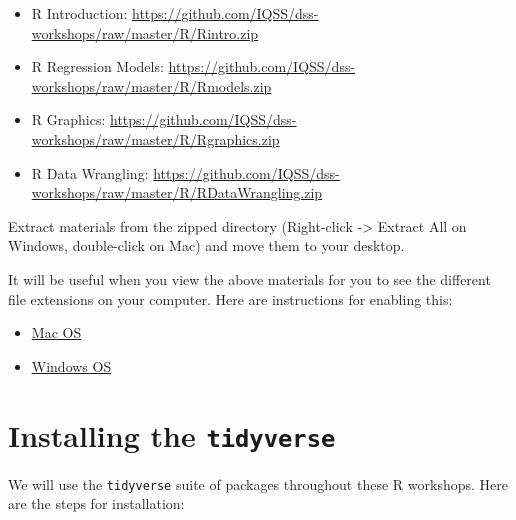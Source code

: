 \documentclass[]{book}
\providecommand{\tightlist}{%
  \setlength{\itemsep}{0pt}\setlength{\parskip}{0pt}}
\begin{document}
\begin{itemize}
\tightlist
\item
  R Introduction:
  \url{https://github.com/IQSS/dss-workshops/raw/master/R/Rintro.zip}
\item
  R Regression Models:
  \url{https://github.com/IQSS/dss-workshops/raw/master/R/Rmodels.zip}
\item
  R Graphics:
  \url{https://github.com/IQSS/dss-workshops/raw/master/R/Rgraphics.zip}
\item
  R Data Wrangling:
  \url{https://github.com/IQSS/dss-workshops/raw/master/R/RDataWrangling.zip}
\end{itemize}

Extract materials from the zipped directory (Right-click -\textgreater{}
Extract All on Windows, double-click on Mac) and move them to your
desktop.

It will be useful when you view the above materials for you to see the
different file extensions on your computer. Here are instructions for
enabling this:

\begin{itemize}
\tightlist
\item
  \href{https://support.apple.com/guide/mac-help/show-or-hide-filename-extensions-on-mac-mchlp2304/mac}{Mac
  OS}
\item
  \href{http://kb.winzip.com/kb/entry/26/}{Windows OS}
\end{itemize}

\section{\texorpdfstring{Installing the
\texttt{tidyverse}}{Installing the tidyverse}}\label{installing-the-tidyverse}

We will use the \texttt{tidyverse} suite of packages throughout these R
workshops. Here are the steps for installation:
\end{document}
